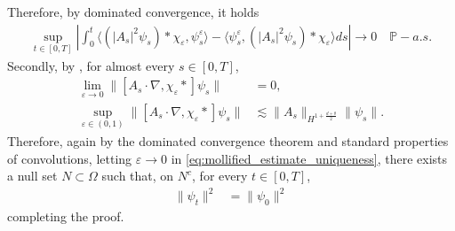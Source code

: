 \documentclass[a4paper,10pt]{amsart}
\renewcommand{\epsilon}{\varepsilon}
\theoremstyle{remark}
\numberwithin{equation}{section}
\begin{document}
    Therefore, by dominated convergence, it holds
    \begin{align*}
        \sup_{t\in [0,T]}\left\lvert\int_0^t 
        \langle \left(|A_s|^2\psi_s\right)\ast\chi_{\epsilon},\psi^{\epsilon}_s\rangle-\langle \psi^{\epsilon}_s,\left(|A_s|^2\psi_s\right)\ast\chi_{\epsilon}\rangle
        ds\right\rvert \rightarrow 0\quad \mathbb{P}-a.s.
    \end{align*}
    Secondly, by \cite[Lemma 4.2]{butori2026background}, for almost every
    $s\in [0,T]$,
   \begin{align*}
       \lim_{\epsilon\rightarrow 0}\|[A_s\cdot\nabla,\chi_{\epsilon}\ast]\psi_s\|&=0,\\
       \sup_{\epsilon\in (0,1)}\|[A_s\cdot\nabla,\chi_{\epsilon}\ast]\psi_s\|&\lesssim \|A_s\|_{H^{1+\frac{d+\theta}{2}}}\|\psi_s\|.
   \end{align*}
   Therefore, again by the dominated convergence theorem and standard
   properties of convolutions, letting $\epsilon\rightarrow 0$ in
   \eqref{eq:mollified_estimate_uniqueness}, there exists a null set
   $N\subset \Omega$ such that, on $N^c$, for every $t\in [0,T]$,
   \begin{align*}
       \|\psi_t\|^2&=\|\psi_0\|^2
   \end{align*}
   completing the proof.
\end{document}
